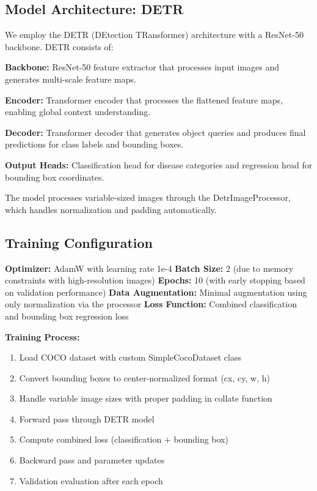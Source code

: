 \documentclass[10pt,twocolumn]{article}
\begin{document}
\subsection{Model Architecture: DETR}

We employ the DETR (DEtection TRansformer) architecture with a ResNet-50 backbone. DETR consists of:

\textbf{Backbone:} ResNet-50 feature extractor that processes input images and generates multi-scale feature maps.

\textbf{Encoder:} Transformer encoder that processes the flattened feature maps, enabling global context understanding.

\textbf{Decoder:} Transformer decoder that generates object queries and produces final predictions for class labels and bounding boxes.

\textbf{Output Heads:} Classification head for disease categories and regression head for bounding box coordinates.

The model processes variable-sized images through the DetrImageProcessor, which handles normalization and padding automatically.

\subsection{Training Configuration}

\textbf{Optimizer:} AdamW with learning rate 1e-4
\textbf{Batch Size:} 2 (due to memory constraints with high-resolution images)
\textbf{Epochs:} 10 (with early stopping based on validation performance)
\textbf{Data Augmentation:} Minimal augmentation using only normalization via the processor
\textbf{Loss Function:} Combined classification and bounding box regression loss

\textbf{Training Process:}
\begin{enumerate}
\item Load COCO dataset with custom SimpleCocoDataset class
\item Convert bounding boxes to center-normalized format (cx, cy, w, h)
\item Handle variable image sizes with proper padding in collate function
\item Forward pass through DETR model
\item Compute combined loss (classification + bounding box)
\item Backward pass and parameter updates
\item Validation evaluation after each epoch
\end{enumerate}
\end{document}

